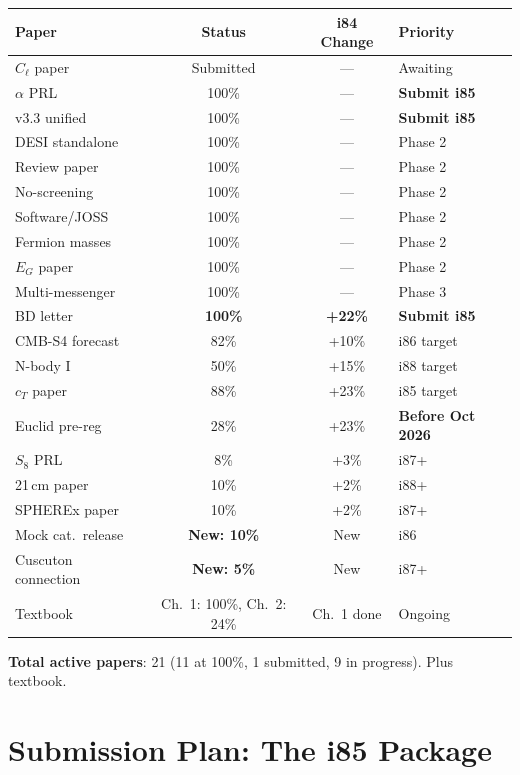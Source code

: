 \documentclass[11pt,a4paper]{article}
\begin{document}
\begin{center}
\begin{tabular}{lccl}
\toprule
\textbf{Paper} & \textbf{Status} & \textbf{i84 Change} & \textbf{Priority} \\
\midrule
$C_\ell$ paper & Submitted & --- & Awaiting \\
$\alpha$ PRL & 100\% & --- & \textbf{Submit i85} \\
v3.3 unified & 100\% & --- & \textbf{Submit i85} \\
DESI standalone & 100\% & --- & Phase 2 \\
Review paper & 100\% & --- & Phase 2 \\
No-screening & 100\% & --- & Phase 2 \\
Software/JOSS & 100\% & --- & Phase 2 \\
Fermion masses & 100\% & --- & Phase 2 \\
$E_G$ paper & 100\% & --- & Phase 2 \\
Multi-messenger & 100\% & --- & Phase 3 \\
BD letter & \textbf{100\%} & \textbf{+22\%} & \textbf{Submit i85} \\
CMB-S4 forecast & 82\% & +10\% & i86 target \\
N-body I & 50\% & +15\% & i88 target \\
$c_T$ paper & 88\% & +23\% & i85 target \\
Euclid pre-reg & 28\% & +23\% & \textbf{Before Oct 2026} \\
$S_8$ PRL & 8\% & +3\% & i87+ \\
21\,cm paper & 10\% & +2\% & i88+ \\
SPHEREx paper & 10\% & +2\% & i87+ \\
Mock cat.\ release & \textbf{New: 10\%} & New & i86 \\
Cuscuton connection & \textbf{New: 5\%} & New & i87+ \\
Textbook & Ch.\ 1: 100\%, Ch.\ 2: 24\% & Ch.\ 1 done & Ongoing \\
\bottomrule
\end{tabular}
\end{center}

\textbf{Total active papers}: 21 (11 at 100\%, 1 submitted, 9 in progress). Plus textbook.

\section{Submission Plan: The i85 Package}
\end{document}

